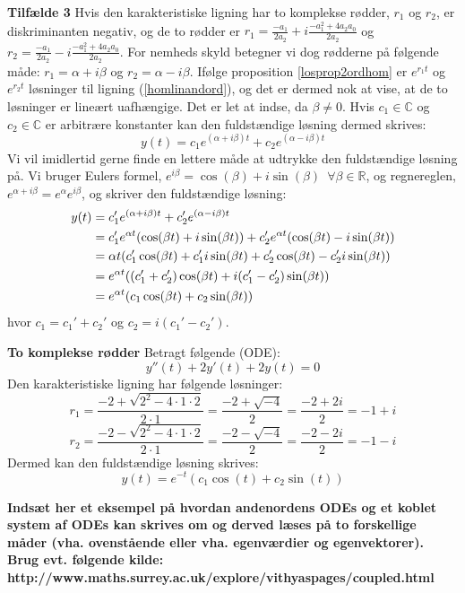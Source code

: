 \hfill \break
\textbf{Tilfælde 3}\hfill \break
Hvis den karakteristiske ligning har to komplekse rødder, $r_1$ og $r_2$, er diskriminanten negativ, og de to rødder er $r_1=\frac{-a_1}{2a_2}+i\frac{-a_1^2+4a_2a_0}{2a_2}$ og $r_2=\frac{-a_1}{2a_2}-i\frac{-a_1^2+4a_2a_0}{2a_2}$. For nemheds skyld betegner vi dog rødderne på følgende måde: $r_1=\alpha+i\beta$ og $r_2=\alpha-i\beta$. Ifølge proposition \ref{losprop2ordhom} er $e^{r_1t}$ og $e^{r_2t}$ løsninger til ligning (\ref{homlinandord}), og det er dermed nok at vise, at de to løsninger er lineært uafhængige. Det er let at indse, da $\beta \neq 0$. Hvis $c_1\in \mathbb{C}$ og $c_2 \in \mathbb{C}$ er arbitrære konstanter kan den fuldstændige løsning dermed skrives:\hfill \break
$$y(t)=c_1e^{(\alpha+i\beta)t}+c_2e^{(\alpha-i\beta)t}$$ \hfill \break
Vi vil imidlertid gerne finde en lettere måde at udtrykke den fuldstændige løsning på. Vi bruger Eulers formel\citep[s. 27]{JAB}, $e^{i\beta}=\cos(\beta)+i\sin(\beta) \enspace \forall \beta \in \mathbb{R}$, og regnereglen, $e^{\alpha+i\beta}=e^{\alpha}e^{i\beta}$, og skriver den fuldstændige løsning:\hfill \break
\begin{align}
y(t)&=c_1'e^{(\alpha+i\beta)t}+c_2'e^{(\alpha-i\beta)t} \notag \\
&=c_1'e^{\alpha t}(\cos(\beta t)+i\sin(\beta t))+c_2'e^{\alpha t}(\cos(\beta t)-i\sin(\beta t)) \notag \\
&={\alpha t}(c_1'\cos(\beta t)+c_1'i\sin(\beta t)+c_2'\cos(\beta t)-c_2'i\sin(\beta t)) \notag \\
&=e^{\alpha t}((c_1'+c_2')\cos(\beta t)+i(c_1'-c_2')\sin(\beta t)) \notag \\
&=e^{\alpha t}(c_1\cos(\beta t)+c_2\sin(\beta t)) 
\end{align}
hvor $c_1=c_1'+c_2'$ og $c_2=i(c_1'-c_2')$.\hfill \break
\begin{Example}\textbf{To komplekse rødder} \hfill \break
\textnormal{Betragt følgende (ODE):}\hfill \break
$$y''(t)+2y'(t)+2y(t)=0$$\hfill \break
\textnormal{Den karakteristiske ligning har følgende løsninger:} \hfill \break
$$r_1=\frac{-2+\sqrt{2^2-4\cdot 1\cdot 2}}{2\cdot 1}=\frac{-2+\sqrt{-4}}{2}=\frac{-2+2i}{2}=-1+i$$
$$r_2=\frac{-2-\sqrt{2^2-4\cdot 1\cdot 2}}{2\cdot 1}=\frac{-2-\sqrt{-4}}{2}=\frac{-2-2i}{2}=-1-i$$\hfill \break
\textnormal{Dermed kan den fuldstændige løsning skrives:}\hfill \break
$$y(t)=e^{-t}(c_1\cos(t)+c_2\sin(t))$$
\end{Example}

\textbf{Indsæt her et eksempel på hvordan andenordens ODEs og et koblet system af ODEs kan skrives om og derved læses på to forskellige måder (vha. ovenstående eller vha. egenværdier og egenvektorer). Brug evt. følgende kilde: http://www.maths.surrey.ac.uk/explore/vithyaspages/coupled.html}

